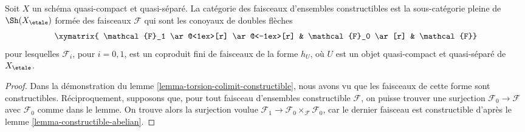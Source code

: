 \begin{lemma}
\label{lemma-category-constructible-sets}
Soit $X$ un sch\'ema quasi-compact et quasi-s\'epar\'e. La cat\'egorie des
faisceaux d'ensembles constructibles est la sous-cat\'egorie pleine de $\Sh(X_\etale)$
form\'ee des faisceaux $\mathcal{F}$ qui sont les conoyaux de doubles fl\`eches
$$
\xymatrix{
\mathcal{F}_1
\ar@<1ex>[r] \ar@<-1ex>[r]
&
\mathcal{F}_0 \ar[r]
&
\mathcal{F}}
$$
pour lesquelles $\mathcal{F}_i$, pour $i = 0, 1$, est un coproduit fini de faisceaux de
la forme $h_U$, o\`u $U$ est un objet quasi-compact et quasi-s\'epar\'e
de $X_\etale$.
\end{lemma}

\begin{proof}
Dans la d\'emonstration du lemme \ref{lemma-torsion-colimit-constructible},
nous avons vu que les faisceaux de cette forme sont constructibles.
R\'eciproquement, supposons que, pour tout faisceau d'ensembles constructible
$\mathcal{F}$, on puisse trouver une surjection $\mathcal{F}_0 \to \mathcal{F}$
avec $\mathcal{F}_0$ comme dans le lemme. On trouve alors la surjection voulue
$\mathcal{F}_1 \to \mathcal{F}_0 \times_\mathcal{F} \mathcal{F}_0$,
car le dernier faisceau est constructible d'apr\`es le lemme \ref{lemma-constructible-abelian}.


\end{proof}
